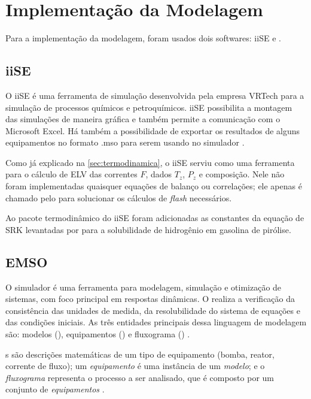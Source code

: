
\section{Implementação da Modelagem} \label{sec:implementacao}

Para a implementação da modelagem, foram usados dois softwares: iiSE e \emso. 

\subsection{iiSE} \label{sec:iise}

O iiSE é uma ferramenta de simulação desenvolvida pela empresa VRTech para a
simulação de processos químicos e petroquímicos. iiSE possibilita a
montagem das simulações de maneira gráfica e também permite a comunicação
com o Microsoft Excel. Há também a possibilidade de exportar os resultados
de alguns equipamentos no formato .mso para serem usando no simulador \emso.

Como já explicado na \autoref{sec:termodinamica}, o iiSE serviu como uma
ferramenta para o cálculo de ELV das correntes $F$, dados $T_z$, $P_z$ e
composição. Nele não foram implementadas quaisquer equações de balanço ou
correlações; ele apenas é chamado pelo \emso para solucionar os cálculos de
\emph{flash} necessários.

Ao pacote termodinâmico do iiSE foram adicionadas as constantes da equação de
SRK levantadas por  para a solubilidade de hidrogênio em
gasolina de pirólise.

\subsection{EMSO} \label{sec:EMSO}

O simulador \emso{} é uma ferramenta para modelagem, simulação e otimização de
sistemas, com foco principal em respostas dinâmicas. O \emso{} realiza a
verificação da consistência das unidades de medida, da resolubilidade do sistema
de equações e das condições iniciais. As três entidades principais dessa
linguagem de modelagem são: modelos (), equipamentos
() e fluxograma () \cite{Soares2003}.

s são descrições matemáticas de um tipo de equipamento (bomba,
reator, corrente de fluxo); um \textit{equipamento} é uma instância de um
\textit{modelo}; e o \textit{fluxograma} representa o processo a ser analisado,
que é composto por um conjunto de \textit{equipamentos} \cite{Soares2003}.


